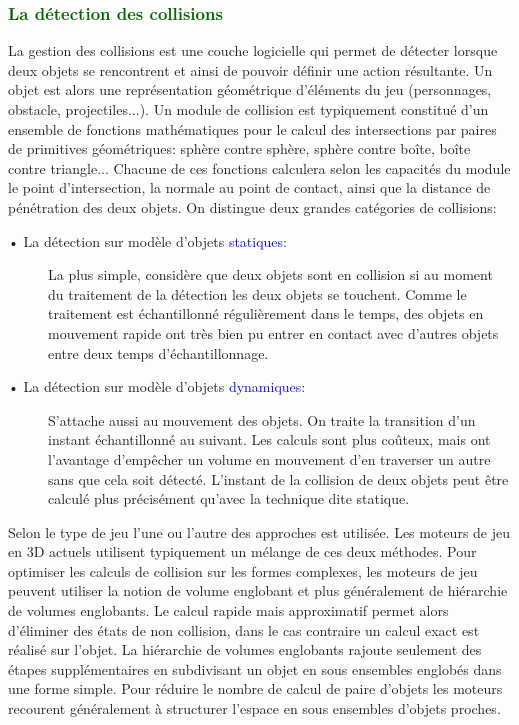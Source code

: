 \documentclass[ebook, 8pt, oneside, openany]{memoir}
\begin{document}
	\subsubsection{\textcolor{darkgreen}{La détection des collisions}}
	La gestion des collisions est une couche logicielle qui permet de détecter lorsque deux objets se
	rencontrent et ainsi de pouvoir définir une action résultante. Un objet est alors une représentation
	géométrique d'éléments du jeu (personnages, obstacle, projectiles...). Un module de collision est
	typiquement constitué d'un ensemble de fonctions mathématiques pour le calcul des intersections par
	paires de primitives géométriques: sphère contre sphère, sphère contre boîte, boîte contre triangle...
	Chacune de ces fonctions calculera selon les capacités du module le point d'intersection, la normale au
	point de contact, ainsi que la distance de pénétration des deux objets. On distingue deux grandes
	catégories de collisions:
	\begin{description}
		\item[• La détection sur modèle d'objets \textcolor{blue}{statiques}:] La plus simple, considère que
		deux objets sont en collision si au moment du traitement de la détection les deux objets se
		touchent. Comme le traitement est échantillonné régulièrement dans le temps, des objets en mouvement
		rapide ont très bien pu entrer en contact avec d'autres objets entre deux temps d'échantillonnage.
		\item[• La détection sur modèle d'objets \textcolor{blue}{dynamiques}:] S'attache aussi au mouvement
		des objets. On traite la transition d'un instant échantillonné au suivant. Les calculs sont plus
		coûteux, mais ont l'avantage d'empêcher un volume en mouvement d'en traverser un autre sans que cela
		soit détecté. L'instant de la collision de deux objets peut être calculé plus précisément qu'avec la
		technique dite statique.
	\end{description}
	Selon le type de jeu l'une ou l'autre des approches est utilisée. Les moteurs de jeu en 3D actuels
	utilisent typiquement un mélange de ces deux méthodes. Pour optimiser les calculs de collision sur les
	formes complexes, les moteurs de jeu peuvent utiliser la notion de volume englobant et plus généralement
	de hiérarchie de volumes englobants. Le calcul rapide mais approximatif permet alors d'éliminer des
	états de non collision, dans le cas contraire un calcul exact est réalisé sur l'objet. La hiérarchie de
	volumes englobants rajoute seulement des étapes supplémentaires en subdivisant un objet en sous
	ensembles englobés dans une forme simple. Pour réduire le nombre de calcul de paire d'objets les moteurs
	recourent généralement à structurer l'espace en sous ensembles d'objets proches.
\end{document}
